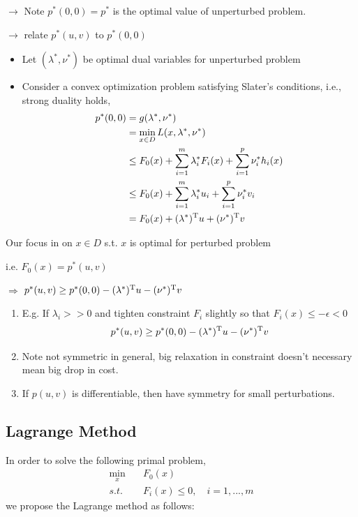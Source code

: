 $\rightarrow$ Note $p^*(0,0) = p^*$ is the optimal value of unperturbed problem.

$\rightarrow$ relate $p^*(u,v)$ to $p^*(0,0)$\\

\begin{itemize}
	\item Let $(\lambda^*, \nu^*)$ be optimal dual variables for unperturbed problem
	
	\item Consider a convex optimization problem satisfying Slater's conditions, i.e., strong duality holds,
	\begin{align*}
		p^*(0,0) &= g(\lambda^*, \nu^*)\\
		&= \min_{x\in D} L(x, \lambda^*, \nu^*)\\
		&\leq F_0(x) + \sum^m_{i=1}\lambda_i^* F_i(x) + \sum^p_{i=1}\nu_i^* h_i(x)\\
		&\leq F_0(x) + \sum^m_{i=1}\lambda_i^* u_i + \sum^p_{i=1}\nu^*_iv_i\\
		&= F_0(x) + (\lambda^*)^{{\rm T}}u+(\nu^*)^{{\rm T}}v
	\end{align*}
\end{itemize}
Our focus in on $x\in D$ s.t. $x$ is optimal for perturbed problem

i.e. $F_0(x)=p^*(u,v)$

$\Rightarrow$ $p^*(u,v) \geq p^*(0,0) - (\lambda^*)^{{\rm T}}u - (\nu^*)^{{\rm T}}v$

\begin{enumerate}
	\item E.g. If $\lambda_i >> 0$ and tighten constraint $F_i$ slightly so that $F_i(x)\leq -\epsilon < 0$
	$$p^*(u,v)\geq p^*(0,0) - (\lambda^*)^{{\rm T}}u - (\nu^*)^{{\rm T}}v$$
	
	\item Note not symmetric in general, big relaxation in constraint doesn't necessary mean big drop in cost.
	
	\item If $p(u,v)$ is differentiable, then have symmetry for small perturbations. 
\end{enumerate}

\subsection{Lagrange Method}
In order to solve the following primal problem,
\begin{align*}
	\min_x &\quad F_0(x)\\
	s.t. &\quad F_i(x) \leq 0,\quad i = 1,...,m
\end{align*}
we propose the Lagrange method as follows:

